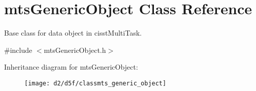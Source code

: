 \hypertarget{classmts_generic_object}{}\section{mts\+Generic\+Object Class Reference}
\label{classmts_generic_object}


Base class for data object in cisst\+Multi\+Task.  




{\ttfamily \#include $<$mts\+Generic\+Object.\+h$>$}

Inheritance diagram for mts\+Generic\+Object\+:\begin{figure}[H]
\begin{center}
\leavevmode
\texttt{[image: d2/d5f/classmts\_generic\_object]}
\end{center}
\end{figure}
